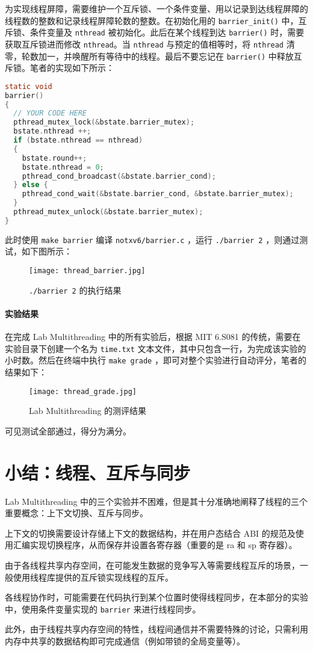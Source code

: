 为实现线程屏障，需要维护一个互斥锁、一个条件变量、用以记录到达线程屏障的线程数的整数和记录线程屏障轮数的整数。在初始化用的 \lstinline{barrier_init()} 中，互斥锁、条件变量及 \lstinline{nthread} 被初始化。此后在某个线程到达 \lstinline{barrier()} 时，需要获取互斥锁进而修改 \lstinline{nthread}。当 \lstinline{nthread} 与预定的值相等时，将 \lstinline{nthread} 清零，轮数加一，并唤醒所有等待中的线程。最后不要忘记在 \lstinline{barrier()} 中释放互斥锁。笔者的实现如下所示：
\begin{lstlisting}[language=C]
static void 
barrier()
{
  // YOUR CODE HERE
  pthread_mutex_lock(&bstate.barrier_mutex);
  bstate.nthread ++;
  if (bstate.nthread == nthread)
  {
    bstate.round++;
    bstate.nthread = 0;
    pthread_cond_broadcast(&bstate.barrier_cond);
  } else {
    pthread_cond_wait(&bstate.barrier_cond, &bstate.barrier_mutex);
  }
  pthread_mutex_unlock(&bstate.barrier_mutex);
}
\end{lstlisting}

此时使用 \lstinline{make barrier} 编译 \lstinline{notxv6/barrier.c} ，运行 \lstinline{./barrier 2} ，则通过测试，如下图所示：
\begin{figure}[H]
  \centering
  \texttt{[image: thread\_barrier.jpg]}
  \caption{ \lstinline{./barrier 2} 的执行结果}
\end{figure}

\paragraph*{实验结果} 在完成 Lab Multithreading 中的所有实验后，根据 MIT 6.S081 的传统，需要在实验目录下创建一个名为 \lstinline{time.txt} 文本文件，其中只包含一行，为完成该实验的小时数。然后在终端中执行 \lstinline{make grade} ，即可对整个实验进行自动评分，笔者的结果如下：
\begin{figure}[H]
  \centering
  \texttt{[image: thread\_grade.jpg]}
  \caption{ Lab Multithreading 的测评结果}
\end{figure}
可见测试全部通过，得分为满分。

\section{小结：线程、互斥与同步}

Lab Multithreading 中的三个实验并不困难，但是其十分准确地阐释了线程的三个重要概念：上下文切换、互斥与同步。

上下文的切换需要设计存储上下文的数据结构，并在用户态结合 ABI 的规范及使用汇编实现切换程序，从而保存并设置各寄存器（重要的是 ra 和 sp 寄存器）。

由于各线程共享内存空间，在可能发生数据的竞争写入等需要线程互斥的场景，一般使用线程库提供的互斥锁实现线程的互斥。

各线程协作时，可能需要在代码执行到某个位置时使得线程同步，在本部分的实验中，使用条件变量实现的 \lstinline{barrier} 来进行线程同步。

此外，由于线程共享内存空间的特性，线程间通信并不需要特殊的讨论，只需利用内存中共享的数据结构即可完成通信（例如带锁的全局变量等）。

